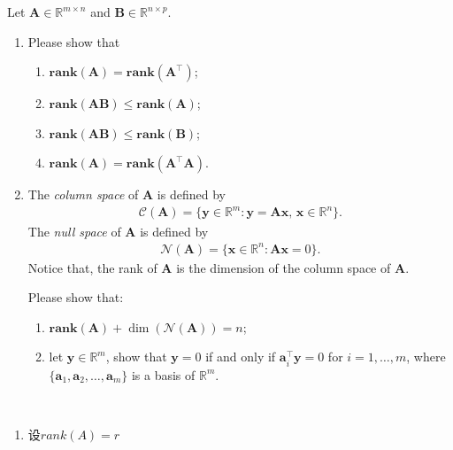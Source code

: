\documentclass[11pt,letter,notitlepage]{article}
\newcommand{\rank}[1]{ \textbf{rank}  (#1)  }
\begin{document}
\begin{exercise}
	Let $\mathbf{A} \in \mathbb{R}^{m\times n}$ and $\mathbf{B}\in \mathbb{R}^{n\times p}$.
	\begin{enumerate}
	    \item Please show that
            \begin{enumerate}
                \item $\rank{\mathbf{A}} = \rank{\mathbf{A}^{\top}}$;
                \item $\rank{\mathbf{A}\mathbf{B}} \leq \rank{\mathbf{A}}$;
                \item $\rank{\mathbf{A}\mathbf{B}} \leq \rank{\mathbf{B}}$;
                \item $\rank{\mathbf{A}} = \rank{\mathbf{A}^{\top}  \mathbf{A}}$.
            \end{enumerate}
        \item The \emph{column space} of $\mathbf{A}$ is defined by
                \begin{align*}
                    \mathcal{C}(\mathbf{A} ) = \{ \mathbf{y}\in \mathbb{R}^m : \mathbf{y} = \mathbf{Ax},\,\mathbf{x}\in\mathbb{R}^n\}.
                \end{align*}
                The \emph{null space} of $\mathbf{A}$ is defined by
                \begin{align*}
                    \mathcal{N}(\mathbf{A})  = \{ \mathbf{x}\in \mathbb{R}^n : \mathbf{Ax}=0\}.
                \end{align*}
                Notice that, the rank of $\mathbf{A}$ is the dimension of the column space of $\mathbf{A}$.
                
                Please show that:
	               \begin{enumerate}
                	    \item $\rank{\mathbf{A}} + \dim ( \mathcal{N}( \mathbf{A} ) ) = n$;
                	    \item let $\mathbf{y}\in \mathbb{R}^m$, show that $\mathbf{y}=0$ if and only if $\mathbf{a}_i^{\top}\mathbf{y}=0$ for $i=1,\ldots,m$, where $\{\mathbf{a}_1,\mathbf{a}_2,\ldots,\mathbf{a}_m\}$ is a basis of $\mathbb{R}^m$.
                	\end{enumerate}    
	\end{enumerate}
\end{exercise}

\begin{solution}
	\heiti
	\ \\
	\begin{enumerate}
		\item 设$ rank(A) = r$
	\end{enumerate}

\end{solution}

\end{document}

